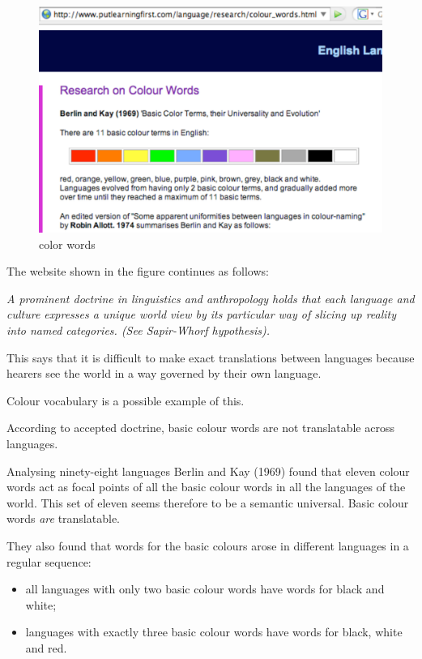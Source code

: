 \begin{figure}
\centering
\includegraphics{./fiColorWords.pdf}
\caption{color words}
\end{figure}

The website shown in the figure continues as follows:

\emph{A prominent doctrine in linguistics and anthropology holds that
each language and culture expresses a unique world view by its
particular way of slicing up reality into named categories. (See
Sapir-Whorf hypothesis).}

This says that it is difficult to make exact translations between
languages because hearers see the world in a way governed by their own
language.

Colour vocabulary is a possible example of this.

According to accepted doctrine, basic colour words are not translatable
across languages.

Analysing ninety-eight languages Berlin and Kay (1969) found that eleven
colour words act as focal points of all the basic colour words in all
the languages of the world. This set of eleven seems therefore to be a
semantic universal. Basic colour words \emph{are} translatable.

They also found that words for the basic colours arose in different
languages in a regular sequence:

\begin{itemize}
\item
  all languages with only two basic colour words have words for black
  and white;
\item
  languages with exactly three basic colour words have words for black,
  white and red.
\end{itemize}

